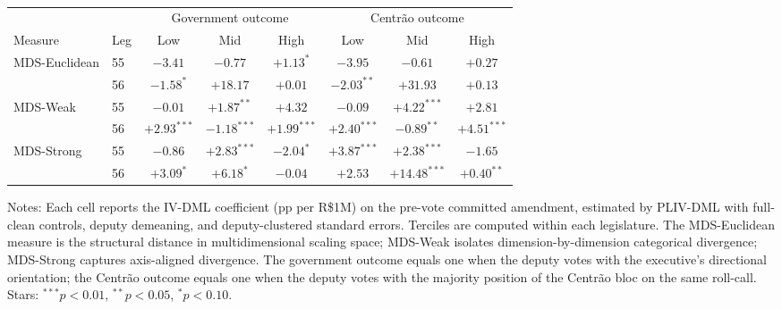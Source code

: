 \begin{table}[htbp]
\centering
\caption{}
\label{tab:t4_dual}
\begin{threeparttable}
\footnotesize
\begin{tabular}{llcccccc}
\toprule
 & & \multicolumn{3}{c}{Government outcome} & \multicolumn{3}{c}{Centrão outcome} \\
\cmidrule(lr){3-5} \cmidrule(lr){6-8}
Measure & Leg & Low & Mid & High & Low & Mid & High \\
\midrule
MDS-Euclidean & 55 & $-3.41$ & $-0.77$ & $+1.13^{*}$ & $-3.95$ & $-0.61$ & $+0.27$ \\
 & 56 & $-1.58^{*}$ & $+18.17$ & $+0.01$ & $-2.03^{**}$ & $+31.93$ & $+0.13$ \\
\midrule
MDS-Weak & 55 & $-0.01$ & $+1.87^{**}$ & $+4.32$ & $-0.09$ & $+4.22^{***}$ & $+2.81$ \\
 & 56 & $+2.93^{***}$ & $-1.18^{***}$ & $+1.99^{***}$ & $+2.40^{***}$ & $-0.89^{**}$ & $+4.51^{***}$ \\
\midrule
MDS-Strong & 55 & $-0.86$ & $+2.83^{***}$ & $-2.04^{*}$ & $+3.87^{***}$ & $+2.38^{***}$ & $-1.65$ \\
 & 56 & $+3.09^{*}$ & $+6.18^{*}$ & $-0.04$ & $+2.53$ & $+14.48^{***}$ & $+0.40^{**}$ \\

\bottomrule
\end{tabular}
\begin{tablenotes}
\footnotesize
\item Notes: Each cell reports the IV-DML coefficient (pp per R\$1M) on the pre-vote committed amendment, estimated by PLIV-DML with full-clean controls, deputy demeaning, and deputy-clustered standard errors. Terciles are computed within each legislature. The MDS-Euclidean measure is the structural distance in multidimensional scaling space; MDS-Weak isolates dimension-by-dimension categorical divergence; MDS-Strong captures axis-aligned divergence. The government outcome equals one when the deputy votes with the executive's directional orientation; the Centrão outcome equals one when the deputy votes with the majority position of the Centrão bloc on the same roll-call. Stars: $^{***}p<0.01$, $^{**}p<0.05$, $^{*}p<0.10$.
\end{tablenotes}
\end{threeparttable}
\end{table}